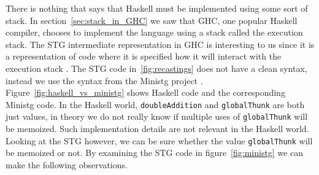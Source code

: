 There is nothing that says that Haskell must be implemented using some
sort of stack. In section~\ref{sec:stack_in_GHC} we saw that GHC, one
popular Haskell compiler, chooses to implement the language using a
stack called the execution stack. The STG intermediate representation
in GHC is interesting to us since it is a representation of code where
it is specified how it will interact with the execution stack \cite{stg_1992, evalapplyjfp06}. The STG
code in~\ref{fig:recastings} does not have a clean syntax, instead we
use the syntax from the Ministg project \cite{haskellwiki_ministg}.
Figure~\ref{fig:haskell_vs_ministg} shows Haskell code and the
corresponding Ministg code. In the Haskell world, \texttt{doubleAddition} and
\texttt{globalThunk} are both just values, in theory we do not really
know if multiple uses of \texttt{globalThunk} will be memoized. Such
implementation details are not relevant in the Haskell world.
Looking at the STG however, we can be sure whether the value
\texttt{globalThunk} will be memoized or not. By examining the STG code
in figure~\ref{fig:ministg} we can make the following observations.

\begin{figure}
\end{figure}

